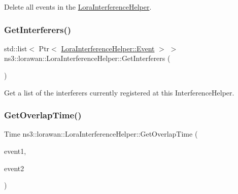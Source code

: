 Delete all events in the \hyperlink{classns3_1_1lorawan_1_1LoraInterferenceHelper}{Lora\+Interference\+Helper}. \mbox{\label{classns3_1_1lorawan_1_1LoraInterferenceHelper_ae95585be5124685f9628d1b9e486a468}} 
\subsubsection{\texorpdfstring{Get\+Interferers()}{GetInterferers()}}
{\footnotesize\ttfamily std\+::list$<$ Ptr$<$ \hyperlink{classns3_1_1lorawan_1_1LoraInterferenceHelper_1_1Event}{Lora\+Interference\+Helper\+::\+Event} $>$ $>$ ns3\+::lorawan\+::\+Lora\+Interference\+Helper\+::\+Get\+Interferers (\begin{DoxyParamCaption}{ }\end{DoxyParamCaption})}

Get a list of the interferers currently registered at this Interference\+Helper. \mbox{\label{classns3_1_1lorawan_1_1LoraInterferenceHelper_a29a3da1aa245b2ec068434ecca44ca75}} 
\subsubsection{\texorpdfstring{Get\+Overlap\+Time()}{GetOverlapTime()}}
{\footnotesize\ttfamily Time ns3\+::lorawan\+::\+Lora\+Interference\+Helper\+::\+Get\+Overlap\+Time (\begin{DoxyParamCaption}\item[{Ptr$<$ \hyperlink{classns3_1_1lorawan_1_1LoraInterferenceHelper_1_1Event}{Lora\+Interference\+Helper\+::\+Event} $>$}]{event1,  }\item[{Ptr$<$ \hyperlink{classns3_1_1lorawan_1_1LoraInterferenceHelper_1_1Event}{Lora\+Interference\+Helper\+::\+Event} $>$}]{event2 }\end{DoxyParamCaption})}

